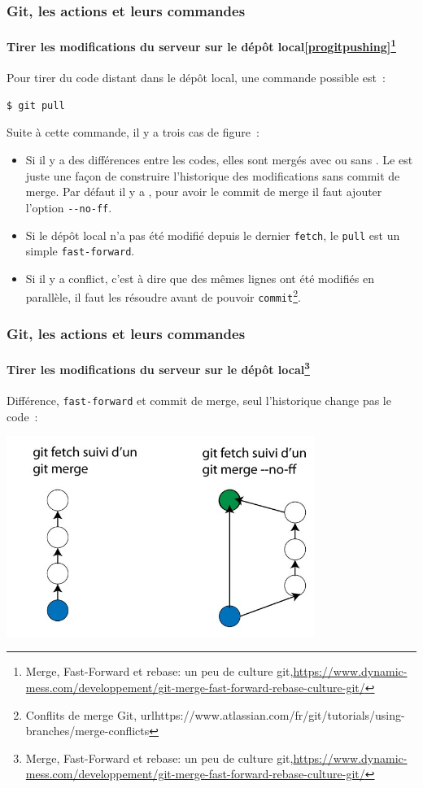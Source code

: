 \documentclass{beamer}
\begin{document}
    \begin{frame}[fragile]
        \frametitle{Git, les actions et leurs commandes}
        \framesubtitle{Tirer les modifications du serveur sur le dépôt local\cref{progitpushing}\footnote{Merge, Fast-Forward et rebase: un peu de culture git,\url{https://www.dynamic-mess.com/developpement/git-merge-fast-forward-rebase-culture-git/}}}
        \transdissolve

        Pour tirer du code distant dans le dépôt local, une commande possible est~:
        \begin{lstlisting}[language=sh]
$ git pull
        \end{lstlisting}

        Suite à cette commande, il y a trois cas de figure~:
        \begin{itemize}
            \item Si il y a des différences entre les codes, elles sont mergés avec ou sans .
            Le  est juste une façon de construire l'historique des modifications sans commit de merge.
            Par défaut il y a , pour avoir le commit de merge il faut ajouter l'option \lstinline{--no-ff}.
            \item Si le dépôt local n'a pas été modifié depuis le dernier \lstinline{fetch}, le \lstinline{pull} est un simple \lstinline{fast-forward}.
            \item Si il y a conflict, c'est à dire que des mêmes lignes ont été modifiés en parallèle, il faut les résoudre avant de pouvoir \lstinline{commit}\footnote{Conflits de merge Git, url{https://www.atlassian.com/fr/git/tutorials/using-branches/merge-conflicts}}.
        \end{itemize}
    \end{frame}

    \begin{frame}
        \frametitle{Git, les actions et leurs commandes}
        \framesubtitle{Tirer les modifications du serveur sur le dépôt local\footnote{Merge, Fast-Forward et rebase: un peu de culture git,\url{https://www.dynamic-mess.com/developpement/git-merge-fast-forward-rebase-culture-git/}}}
        \transdissolve

        Différence, \lstinline{fast-forward} et commit de merge, seul l'historique change pas le code~:
        \begin{center}
            \includegraphics[width=10cm]{image/fast-forward-merge.png}
        \end{center}
    \end{frame}
\end{document}
